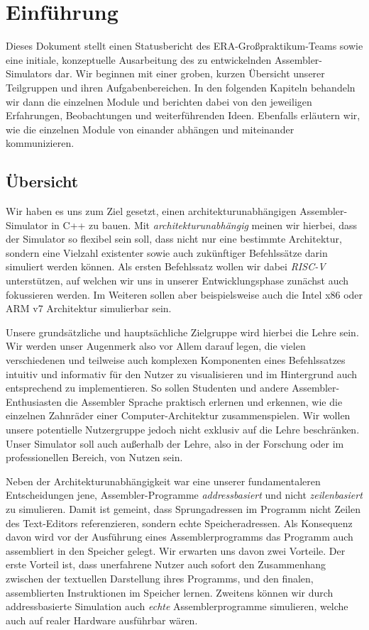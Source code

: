\chapter{Einführung}

Dieses Dokument stellt einen Statusbericht des ERA-Großpraktikum-Teams sowie
eine initiale, konzeptuelle Ausarbeitung des zu entwickelnden Assembler-
Simulators dar.  Wir beginnen mit einer groben, kurzen Übersicht unserer
Teilgruppen und ihren Aufgabenbereichen.  In den folgenden Kapiteln behandeln
wir dann die einzelnen Module und berichten dabei von den jeweiligen
Erfahrungen, Beobachtungen und weiterführenden Ideen.  Ebenfalls erläutern wir,
wie die einzelnen Module von einander abhängen und miteinander kommunizieren.

\section{Übersicht}

Wir haben es uns zum Ziel gesetzt, einen architekturunabhängigen
Assembler-Simulator in C++ zu bauen. Mit \emph{architekturunabhängig} meinen wir
hierbei, dass der Simulator so flexibel sein soll, dass nicht nur eine bestimmte
Architektur, sondern eine Vielzahl existenter sowie auch zukünftiger
Befehlssätze darin simuliert werden können. Als ersten Befehlssatz wollen wir
dabei \emph{RISC-V} unterstützen, auf welchen wir uns in unserer
Entwicklungsphase zunächst auch fokussieren werden. Im Weiteren sollen aber
beispielsweise auch die Intel x86 oder ARM v7 Architektur simulierbar sein.

Unsere grundsätzliche und hauptsächliche Zielgruppe wird hierbei die Lehre
sein. Wir werden unser Augenmerk also vor Allem darauf legen, die vielen
verschiedenen und teilweise auch komplexen Komponenten eines Befehlssatzes
intuitiv und informativ für den Nutzer zu visualisieren und im Hintergrund auch
entsprechend zu implementieren. So sollen Studenten und andere
Assembler-Enthusiasten die Assembler Sprache praktisch erlernen und erkennen,
wie die einzelnen Zahnräder einer Computer-Architektur zusammenspielen. Wir
wollen unsere potentielle Nutzergruppe jedoch nicht exklusiv auf die Lehre
beschränken. Unser Simulator soll auch außerhalb der Lehre, also in der
Forschung oder im professionellen Bereich, von Nutzen sein.

Neben der Architekturunabhängigkeit war eine unserer fundamentaleren
Entscheidungen jene, Assembler-Programme \emph{addressbasiert} und nicht
\emph{zeilenbasiert} zu simulieren. Damit ist gemeint, dass Sprungadressen im
Programm nicht Zeilen des Text-Editors referenzieren, sondern echte
Speicheradressen. Als Konsequenz davon wird vor der Ausführung eines
Assemblerprogramms das Programm auch assembliert in den Speicher gelegt. Wir
erwarten uns davon zwei Vorteile. Der erste Vorteil ist, dass unerfahrene Nutzer
auch sofort den Zusammenhang zwischen der textuellen Darstellung ihres
Programms, und den finalen, assemblierten Instruktionen im Speicher
lernen. Zweitens können wir durch addressbasierte Simulation auch \emph{echte}
Assemblerprogramme simulieren, welche auch auf realer Hardware ausführbar wären.

